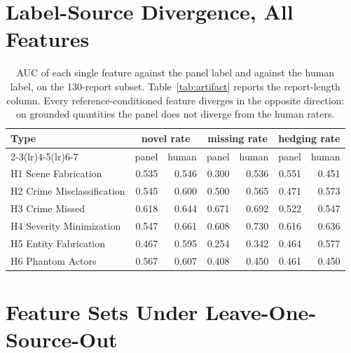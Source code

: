 \section{Label-Source Divergence, All Features}
\label{app:divergence}

\begin{table}[H]
\caption{AUC of each single feature against the panel label and against the
human label, on the 130-report subset. Table~\ref{tab:artifact} reports the
report-length column. Every reference-conditioned feature diverges in the
opposite direction: on grounded quantities the panel does not diverge from the
human raters.}
\label{tab:divergencefull}
\centering\footnotesize
\begin{tabular}{lrrrrrr}
\toprule
Type & \multicolumn{2}{c}{novel rate} & \multicolumn{2}{c}{missing rate} & \multicolumn{2}{c}{hedging rate} \\
\cmidrule(lr){2-3}\cmidrule(lr){4-5}\cmidrule(lr){6-7}
 & panel & human & panel & human & panel & human \\
\midrule
H1 Scene Fabrication       & 0.535 & 0.546 & 0.300 & 0.536 & 0.551 & 0.451 \\
H2 Crime Misclassification & 0.545 & 0.600 & 0.500 & 0.565 & 0.471 & 0.573 \\
H3 Crime Missed            & 0.618 & 0.644 & 0.671 & 0.692 & 0.522 & 0.547 \\
H4 Severity Minimization   & 0.547 & 0.661 & 0.608 & 0.730 & 0.616 & 0.636 \\
H5 Entity Fabrication      & 0.467 & 0.595 & 0.254 & 0.342 & 0.464 & 0.577 \\
H6 Phantom Actors          & 0.567 & 0.607 & 0.408 & 0.450 & 0.461 & 0.450 \\
\bottomrule
\end{tabular}
\end{table}

\section{Feature Sets Under Leave-One-Source-Out}
\label{app:features}

